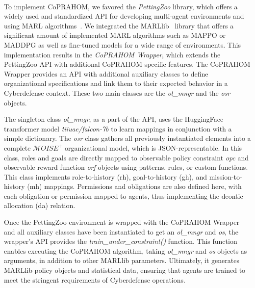 \documentclass[a4paper,twoside]{article}
\begin{document}

\

To implement CoPRAHOM, we favored the \emph{PettingZoo} library, which offers a widely used and standardized API for developing multi-agent environments and using MARL algorithms~\cite{Terry2021}. We integrated the MARLlib~\cite{hu2022marllib} library that offers a significant amount of implemented MARL algorithms such as MAPPO or MADDPG as well as fine-tuned models for a wide range of environments. This implementation results in the \textit{CoPRAHOM Wrapper}, which extends the PettingZoo API with additional CoPRAHOM-specific features.
%
The CoPRAHOM Wrapper provides an API with additional auxiliary classes to define organizational specifications and link them to their expected behavior in a Cyberdefense context. These two main classes are the \textit{ol\_mngr} and the \textit{osr} objects.

The singleton class \textit{ol\_mngr}, as a part of the API, uses the HuggingFace transformer model \textit{tiiuae/falcon-7b} to learn mappings in conjunction with a simple dictionary.
The \textit{osr} class gathers all previously instantiated elements into a complete $\mathcal{M}OISE^+$ organizational model, which is JSON-representable. In this class, roles and goals are directly mapped to observable policy constraint \textit{opc} and observable reward function \textit{orf} objects using patterns, rules, or custom functions. This class implements role-to-history (rh), goal-to-history (gh), and mission-to-history (mh) mappings. Permissions and obligations are also defined here, with each obligation or permission mapped to agents, thus implementing the deontic allocation (da) relation.

Once the PettingZoo environment is wrapped with the CoPRAHOM Wrapper and all auxiliary classes have been instantiated to get an \textit{ol\_mngr} and \textit{os}, the wrapper's API provides the \textit{train\_under\_constraint()} function. This function enables executing the CoPRAHOM algorithm, taking \textit{ol\_mngr} and \textit{os} objects as arguments, in addition to other MARLlib parameters. Ultimately, it generates MARLlib policy objects and statistical data, ensuring that agents are trained to meet the stringent requirements of Cyberdefense operations.
\end{document}
